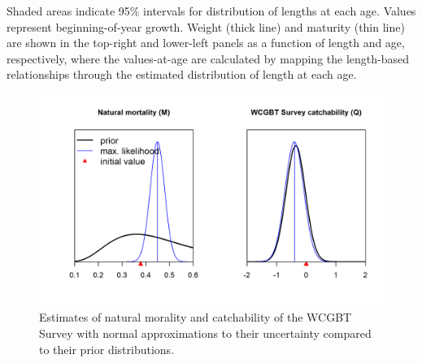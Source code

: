 \documentclass[12pt,]{article}
\begin{document}
\begin{minipage}{\linewidth}%
\label{fig:growth}%
\begin{centering}
Shaded areas indicate 95\% intervals for distribution of lengths at each age. Values represent beginning-of-year growth.  Weight (thick line) and maturity (thin line) are shown in the top-right and lower-left panels as a function of length and age, respectively, where the values-at-age are calculated by mapping the length-based relationships through the estimated distribution of length at each age.
\end{centering}
\end{minipage}

\FloatBarrier

\FloatBarrier

\begin{figure}
\centering
\includegraphics{Figures/fit_to_priors.png}
\caption{Estimates of natural morality and catchability of the WCGBT
Survey with normal approximations to their uncertainty compared to their
prior distributions. \label{fig:fit_to_priors}}
\end{figure}
\end{document}
